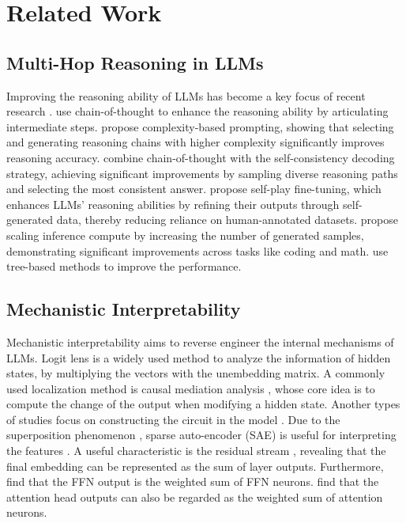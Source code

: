 \section{Related Work}
\subsection{Multi-Hop Reasoning in LLMs}
Improving the reasoning ability of LLMs has become a key focus of recent research \cite{lightman2023let,huang2023large,li2024chain,wang2024chain}. \citet{wei2022chain} use chain-of-thought to enhance the reasoning ability by articulating intermediate steps. \citet{fu2022complexity} propose complexity-based prompting, showing that selecting and generating reasoning chains with higher complexity significantly improves reasoning accuracy. \citet{wang2022self} combine chain-of-thought with the self-consistency decoding strategy, achieving significant improvements by sampling diverse reasoning paths and selecting the most consistent answer. \citet{chen2024self} propose self-play fine-tuning, which enhances LLMs' reasoning abilities by refining their outputs through self-generated data, thereby reducing reliance on human-annotated datasets. \citet{brown2024large} propose scaling inference compute by increasing the number of generated samples, demonstrating significant improvements across tasks like coding and math. \citet{hao2023reasoning,yao2024tree} use tree-based methods to improve the performance.

\subsection{Mechanistic Interpretability}
Mechanistic interpretability \cite{Chris2022} aims to reverse engineer the internal mechanisms of LLMs. Logit lens \cite{nostalgebraist2020} is a widely used method \cite{dar2022analyzing,katz2023visit,yu2024interpreting} to analyze the information of hidden states, by multiplying the vectors with the unembedding matrix. A commonly used localization method is causal mediation analysis \cite{vig2020investigating,meng2022locating,stolfo2023mechanistic,geva2023dissecting}, whose core idea is to compute the change of the output when modifying a hidden state. Another types of studies focus on constructing the circuit in the model \cite{olsson2022context,zhang2023towards,gould2023successor,hanna2024does,wang2022interpretability}. Due to the superposition phenomenon \cite{elhage2022toy,scherlis2022polysemanticity,bricken2023towards}, sparse auto-encoder (SAE) is useful for interpreting the features \cite{gao2024scaling,templeton2024scaling,cunningham2023sparse}. A useful characteristic is the residual stream \cite{elhage2021mathematical}, revealing that the final embedding can be represented as the sum of layer outputs. Furthermore, \citet{geva2020transformer,geva2022transformer} find that the FFN output is the weighted sum of FFN neurons. \citet{yu2024neuron} find that the attention head outputs can also be regarded as the weighted sum of attention neurons. 

